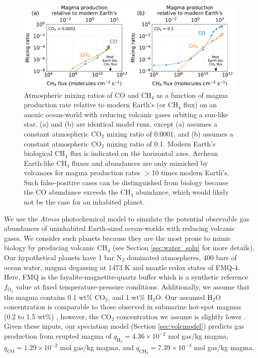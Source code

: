 \begin{figure}
  \centering
  \includegraphics[width=\textwidth]{tex/3methane/figures/Figure4.pdf}
  \caption{Atmospheric mixing ratios of CO and CH$_4$ as a function of magma production rate relative to modern Earth's (or CH$_4$ flux) on an anoxic ocean-world with reducing volcanic gases orbiting a sun-like star. (a) and (b) are identical model runs, except (a) assumes a constant atmospheric CO$_2$ mixing ratio of 0.0001, and (b) assumes a constant atmospheric CO$_2$ mixing ratio of 0.1. Modern Earth's biological CH$_4$ flux is indicated on the horizontal axes. Archean Earth-like CH$_4$ fluxes and abundances are only mimicked by volcanoes for magma production rates $>$10 times modern Earth's. Such false-positive cases can be distinguished from biology because the CO abundance exceeds the CH$_4$ abundance, which would likely not be the case for an inhabited planet.}
  \label{fig:photosun}
\end{figure}

We use the \textit{Atmos} photochemical model to simulate the potential observable gas abundances of uninhabited Earth-sized ocean-worlds with reducing volcanic gases. We consider such planets because they are the most prone to mimic biology by producing volcanic CH$_4$ (see Section \ref{sec:water_solu} for more details). Our hypothetical planets have 1 bar N$_2$ dominated atmospheres, 400 bars of ocean water, magma degassing at 1473 K and mantle redox states of FMQ-4. Here, FMQ is the fayalite-magnetite-quartz buffer which is a synthetic reference $f_\mathrm{O_2}$ value at fixed temperature-pressure conditions. Additionally, we assume that the magma contains 0.1 wt\% CO$_2$, and 1 wt\% H$_2$O. Our assumed H$_2$O concentration is comparable to those observed in submarine hot-spot magmas (0.2 to 1.5 wt\%) \citep{Wallace_2015}, however, the CO$_2$ concentration we assume is slightly lower \citep{Anderson_2017}. Given these inputs, our speciation model (Section \ref{sec:volcmodel}) predicts gas production from erupted magma of $q_\mathrm{H_2} = 4.36\times 10^{-2}$ mol gas/kg magma, $q_\mathrm{CO} = 1.29\times 10^{-2}$ mol gas/kg magma, and $q_\mathrm{CH_4} = 7.39\times 10^{-3}$ mol gas/kg magma.

